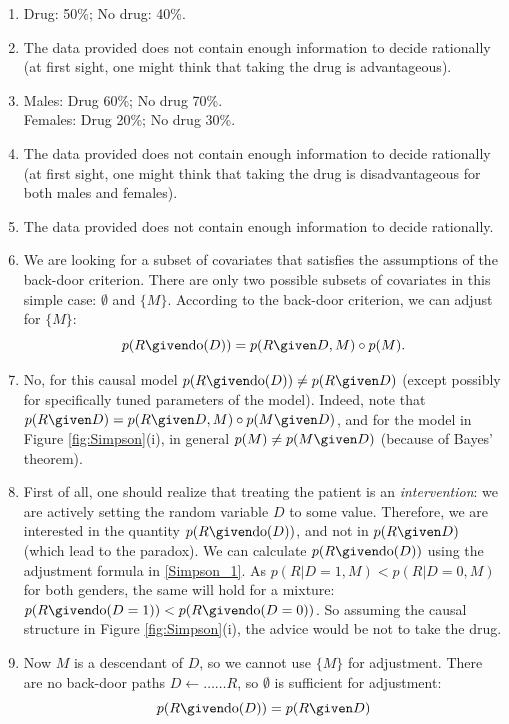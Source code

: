 \begin{enumerate}
\begin{gradedsolution}
\begin{enumerate}
  \item Drug: 50\%; No drug: 40\%. 
  \item The data provided does not contain enough information to decide rationally (at first sight, one might think that taking the drug is advantageous).
  \item Males: Drug 60\%; No drug 70\%.\\
  Females: Drug 20\%; No drug 30\%. 
  \item  The data provided does not contain enough information to decide rationally (at first sight, one might think that taking the drug is disadvantageous for both males and females).
  \item The data provided does not contain enough information to decide rationally.
  \item We are looking for a subset of covariates that satisfies the assumptions of the back-door criterion. There are only two possible
  subsets of covariates in this simple case: $\emptyset$ and $\{M\}$. According to the back-door criterion, we can adjust for $\{M\}$:
  $$p(R \given \text{do}(D)) = p(R \given D, M) \circ p(M).$$
  \item No, for this causal model $p(R \given \text{do}(D)) \ne p(R \given D)$ (except possibly for specifically tuned parameters of the model). Indeed,
  note that $p(R \given D) = p(R \given D, M) \circ p(M \given D)$, and for the model in Figure \ref{fig:Simpson}(i), in general $p(M) \ne p(M \given D)$ (because of Bayes' theorem). 
  \item First of all, one should realize that treating the patient is an \emph{intervention}: we are actively setting the random variable $D$ to some value.
  Therefore, we are interested in the quantity $p(R \given \text{do}(D))$, and not in $p(R \given D)$ (which lead to the paradox). We can calculate
  $p(R \given \text{do}(D))$ using the adjustment formula in \ref{Simpson_1}. As $p(R|D=1,M) < p(R|D=0,M)$ for both genders, the same will hold for a mixture:
  $p(R \given \text{do}(D=1)) < p(R \given \text{do}(D=0))$. So assuming
  the causal structure in Figure \ref{fig:Simpson}(i), the advice would be not to take the drug.
  \item Now $M$ is a descendant of $D$, so we cannot use $\{M\}$ for adjustment. There are no back-door paths $D \leftarrow \dots \dots R$, so
  $\emptyset$ is sufficient for adjustment:
  $$p(R \given \text{do}(D)) = p(R \given D)$$ 

\end{enumerate}
\end{gradedsolution}
\end{enumerate}
